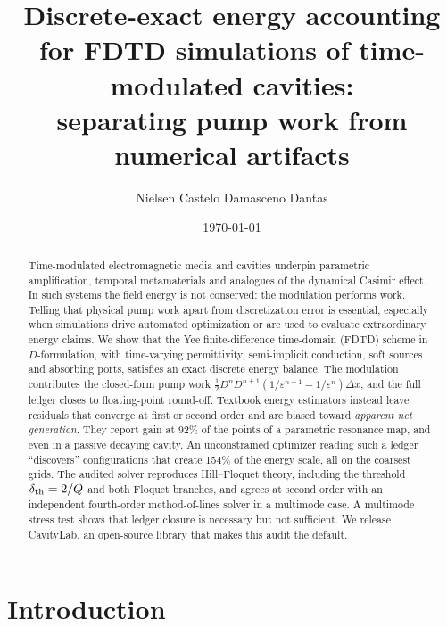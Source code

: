 \documentclass[aps,pre,reprint,superscriptaddress,amsmath,amssymb]{revtex4-2}
\begin{document}
\title{Discrete-exact energy accounting for FDTD simulations of time-modulated cavities:\\
separating pump work from numerical artifacts}

\author{Nielsen Castelo Damasceno Dantas}

\date{\today}

\begin{abstract}
Time-modulated electromagnetic media and cavities underpin parametric amplification,
temporal metamaterials and analogues of the dynamical Casimir effect. In such
systems the field energy is not conserved: the modulation performs work. Telling
that physical pump work apart from discretization error is essential, especially
when simulations drive automated optimization or are used to evaluate extraordinary
energy claims. We show that the Yee finite-difference time-domain (FDTD) scheme in
$D$-formulation, with time-varying permittivity, semi-implicit conduction, soft
sources and absorbing ports, satisfies an exact discrete energy balance. The
modulation contributes the closed-form pump work
$\tfrac12 D^nD^{n+1}(1/\varepsilon^{n+1}-1/\varepsilon^n)\Delta x$, and the full
ledger closes to floating-point round-off. Textbook energy estimators instead leave
residuals that converge at first or second order and are biased toward
\emph{apparent net generation}. They report gain at 92\% of the points of a
parametric resonance map, and even in a passive decaying cavity. An unconstrained
optimizer reading such a ledger ``discovers'' configurations that create 154\% of
the energy scale, all on the coarsest grids. The audited solver reproduces
Hill--Floquet theory, including the threshold $\delta_{\rm th}=2/Q$ and both Floquet
branches, and agrees at second order with an independent fourth-order
method-of-lines solver in a multimode case. A multimode stress test shows that
ledger closure is necessary but not sufficient. We release CavityLab, an
open-source library that makes this audit the default.
\end{abstract}

\maketitle

\section{Introduction}
\end{document}
